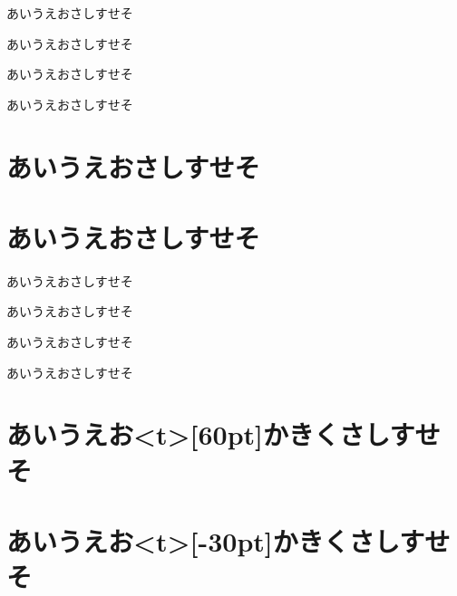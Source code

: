 \documentclass{jarticle}
\begin{document}
あいうえおさしすせそ\par
あいうえおさしすせそ\par

あいうえおさしすせそ\par
あいうえおさしすせそ\par

\section{あいうえおさしすせそ}
\section{あいうえおさしすせそ}

あいうえおさしすせそ\par
あいうえおさしすせそ\par %

あいうえおさしすせそ\par
あいうえおさしすせそ\par %

\section{あいうえお\pbox<t>[60pt]{かきく}さしすせそ}
\section{あいうえお\pbox<t>[-30pt]{かきく}さしすせそ}
\end{document}
